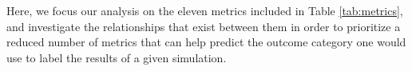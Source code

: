 Here, we focus our analysis on the eleven metrics included in Table \ref{tab:metrics}, and investigate the relationships that exist between them in order to prioritize a reduced number of metrics that can help predict the outcome category one would use to label the results of a given simulation.

%
% 





